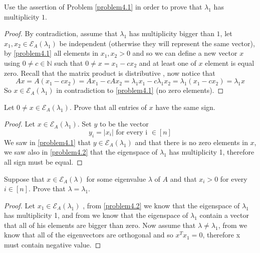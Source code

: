 \documentclass[a4paper, 11pt, oneside]{article}
\newenvironment{problem}[1]
  {\renewcommand\theinnercustomprob{#1}\innercustomprob}
  {\endinnercustomprob}
\newcommand{\N}{\mathbb{N}}
\newcommand\abs[1]{\left|#1\right|}
\begin{document}
\begin{problem}{4.2}\label{problem4.2}
Use the assertion of Problem \ref{problem4.1} in order to prove that $\lambda_1$ has multiplicity $1$.
\end{problem}

\begin{proof}
By contradiction, assume that $\lambda_1$ has multiplicity bigger than $1$,
let $x_1,x_2 \in \mathcal{E}_A(\lambda_1)$ be independent (otherwise they will represent the same vector), by \ref{problem4.1} all elements in $x_1,x_2 > 0$ and so we can define a new vector $x$ using $0 \neq c \in \N$ such that $0 \neq x = x_1 - c x_2$ and at least one of $x$ element is equal zero.
Recall that the matrix product is distributive \cite{matrix_multiplication}, now notice that 
\begin{equation*}
 Ax = A(x_1 - c x_2) = Ax_1 - cAx_2= \lambda_1 x_1 - c\lambda_1 x_2 = \lambda_1 (x_1 -cx_2) = \lambda_1 x
\end{equation*}
So $x \in  \mathcal{E}_A(\lambda_1)$ in contradiction to \ref{problem4.1} (no zero elements).
\end{proof}

\begin{problem}{4.3}\label{problem4.3}
Let $0 \neq x \in \mathcal{E}_A(\lambda_1)$. Prove that all entries of $x$ have the same sign.
\end{problem}

\begin{proof}
Let $x \in \mathcal{E}_A(\lambda_1)$. Set $y$ to be the vector 
\begin{equation*}
y_i = \abs{x_i} \text{ for every i } \in [n]
\end{equation*}
We saw in \ref{problem4.1} that  $y \in \mathcal{E}_A(\lambda_1)$ and that there is no zero elements in $x$, we saw also in \ref{problem4.2} that the eigenspace of $\lambda_1$ has multiplicity 1, therefore all sign must be equal. 
\end{proof}

\begin{problem}{4.4}\label{problem4.4}
Suppose that $x \in \mathcal{E}_A(\lambda)$ for some eigenvalue $\lambda$ of $A$ and that $x_i > 0$ for every $i \in [n]$.
Prove that $\lambda = \lambda_1$.
\end{problem}

\begin{proof}
Let $x_1 \in \mathcal{E}_A(\lambda_1)$ , from \ref{problem4.2} we know that the eigenspace of $\lambda_1$ has multiplicity 1,  and from \cite{perron_frobenius} we know that the eigenspace of $\lambda_1$ contain a vector that all of his elements are bigger than zero.
Now assume that $\lambda \neq \lambda_1$, from \cite{orthogonal_eigenvectors} we know that all of the eigenvectors are orthogonal and so $x^Tx_1 = 0$, therefore x must contain negative value.
\end{proof}
\end{document}
